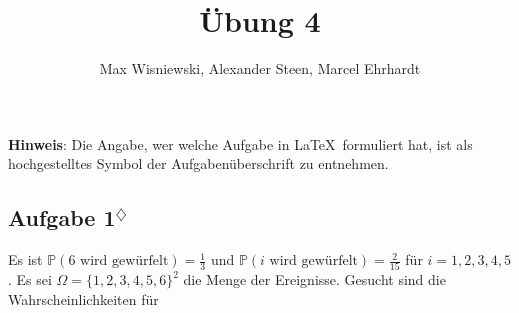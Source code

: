 \documentclass[11pt,a4paper,ngerman]{article}
\date{}
\title{Übung 4}
\author{Max Wisniewski\maxw, Alexander Steen\alex, Marcel Ehrhardt\marcel}
\newcommand{\set}[1]{ \{ #1 \}}
\newcommand{\Prob}{\mathbb{P}}
\newcommand{\marcel}{$^\diamondsuit$}
\begin{document}

\renewcommand{\figurename}{Figure}

\maketitle
\thispagestyle{fancy}

\begin{center}
\textbf{Hinweis}: Die Angabe, wer welche Aufgabe in \LaTeX\ formuliert hat, ist als hochgestelltes Symbol der Aufgabenüberschrift zu entnehmen.
\end{center}


\subsection*{Aufgabe 1\marcel}
Es ist $\Prob(\text{6 wird gewürfelt}) = \frac{1}{3}$ und $\Prob(\text{$i$ wird gewürfelt}) = \frac{2}{15}$ für $i = 1,2,3,4,5$. Es sei $\Omega = \set{1,2,3,4,5,6}^2$ die Menge der Ereignisse. Gesucht sind die Wahrscheinlichkeiten für
\end{document}
